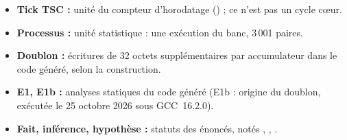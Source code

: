 \begin{itemize}
\item[•] \textbf{Tick TSC :} unité du compteur d'horodatage () ; ce n'est pas un cycle cœur.

\item[•] \textbf{Processus :} unité statistique : une exécution du banc, 3\,001 paires.

\item[•] \textbf{Doublon :} écritures de 32 octets supplémentaires par accumulateur dans le code généré, selon la construction.

\item[•] \textbf{E1, E1b :} analyses statiques du code généré (E1b : origine du doublon, exécutée le 25 octobre 2026 sous GCC~16.2.0).

\item[•] \textbf{Fait, inférence, hypothèse :} statuts des énoncés, notés \F{}, \I{}, \Hy{}.

\end{itemize}
\clearpage
